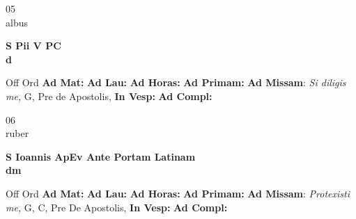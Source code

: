 \documentclass[10pt, openany]{book}
\begin{document}
    \begin{center}
        \begin{minipage}{3.5in}
            \vspace{2em}
            \begin{minipage}{0.5in}
                {\Huge 05} \\
                {\normalsize albus}
            \end{minipage}
            \begin{minipage}{3.0in}
                \textbf{ \large S Pii V PC \\
                \textnormal{\normalsize d}}

            \end{minipage}
            \begin{justify}Off Ord
                \textbf{Ad Mat: }
                \textbf{Ad Lau: }
                \textbf{Ad Horas: }
                \textbf{Ad Primam: }\textbf{Ad Missam}: \textit{Si diligis me,} G, Pre de Apostolis, 
                \textbf{In Vesp: }
                \textbf{Ad Compl: }
            \end{justify}
        \end{minipage}
    \end{center}

    \begin{center}
        \begin{minipage}{3.5in}
            \vspace{2em}
            \begin{minipage}{0.5in}
                {\Huge 06} \\
                {\normalsize ruber}
            \end{minipage}
            \begin{minipage}{3.0in}
                \textbf{ \large S Ioannis ApEv Ante Portam Latinam \\
                \textnormal{\normalsize dm}}

            \end{minipage}
            \begin{justify}Off Ord
                \textbf{Ad Mat: }
                \textbf{Ad Lau: }
                \textbf{Ad Horas: }
                \textbf{Ad Primam: }\textbf{Ad Missam}: \textit{Protexisti me,} G, C, Pre De Apostolis, 
                \textbf{In Vesp: }
                \textbf{Ad Compl: }
            \end{justify}
        \end{minipage}
    \end{center}
\end{document}
